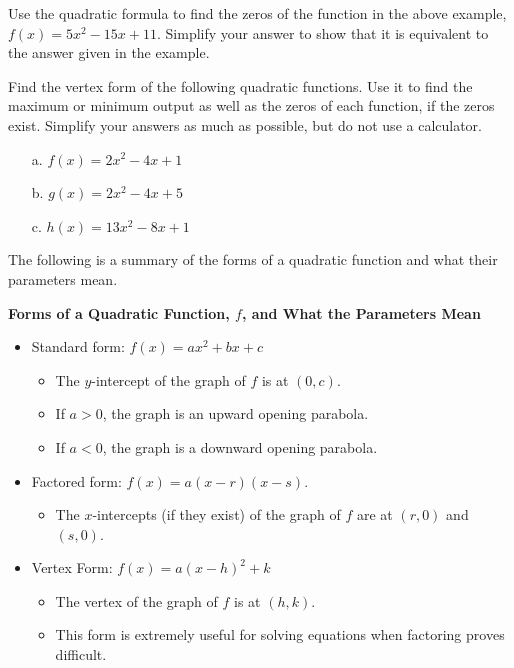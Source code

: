 \begin{question} Use the quadratic formula to find the zeros of the function in the above example, $f(x) = 5x^2-15x+11$. Simplify your answer to show that it is equivalent to the answer given in the example.
\end{question}

\begin{question} Find the vertex form of the following quadratic functions. Use it to find the maximum or minimum output as well as the zeros of each function, if the zeros exist. Simplify your answers as much as possible, but do not use a calculator.
\begin{enumerate}
\item[a.] $f(x) = 2x^2-4x+1$
\item[b.] $g(x) = 2x^2-4x+5$
\item[c.] $h(x) = 13x^2 -8x + 1$
\end{enumerate} 
\end{question}

The following is a summary of the forms of a quadratic function and what their parameters mean.

\vfill

\pagebreak

\begin{tcolorbox}
{\bf Forms of a Quadratic Function, $f$, and What the Parameters Mean}\\
\begin{itemize}
\item Standard form: $f(x) = ax^2+bx+c$
\begin{itemize}
\item The $y$-intercept of the graph of $f$ is at $(0,c)$.
\item If $a>0$, the graph is an upward opening parabola.
\item If $a<0$, the graph is a downward opening parabola.
\end{itemize}
\item Factored form: $f(x) = a(x-r)(x-s)$.
\begin{itemize}
\item The $x$-intercepts (if they exist) of the graph of $f$ are at $(r,0)$ and $(s,0)$.
\end{itemize}
\item Vertex Form: $f(x) = a(x-h)^2 + k$
\begin{itemize}
\item The vertex of the graph of $f$ is at $(h,k)$.
\item This form is extremely useful for solving equations when factoring proves difficult.
\end{itemize} 
\end{itemize}
\end{tcolorbox}

